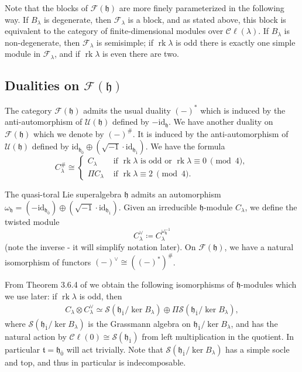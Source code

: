 \documentclass[12pt, a4paper, reqno]{amsart}
\def\FF{\mathcal{F}}
\def\SS{\mathcal{S}}
\def\CC{\mathcal{C}}
\def\h{\mathfrak{h}}
\def\ol{\overline}
\def\rk{\operatorname{rk}}
\theoremstyle{definition}
\theoremstyle{definition}
\theoremstyle{definition}
\numberwithin{theorem}{section}
\numberwithin{lemma}{section}
\numberwithin{remark}{section}
\numberwithin{definition}{section}
\numberwithin{corollary}{section}
\numberwithin{proposition}{section}
\numberwithin{example}{section}
\begin{document}
	Note that the blocks of \(\mathcal{F}(\mathfrak{h})\) are more finely parameterized in the following way. If \(B_\lambda\) is degenerate, then $\FF_{\lambda}$ is a block, and as stated above, this block is equivalent to the category of finite-dimensional modules over \(\CC\ell(\lambda)\). If \(B_{\lambda}\) is non-degenerate, then $\FF_{\lambda}$ is semisimple; if \(\rk \lambda\) is odd there is exactly one simple module in $\FF_{\lambda}$, and if \(\rk \lambda\) is even there are two. 
	
	\subsection{Dualities on $\FF(\h)$}\label{section_dualities}
	The category \(\mathcal{F}(\mathfrak{h})\) admits the usual duality \((-)^*\) which is induced by the anti-automorphism of \(\mathcal{U}(\mathfrak{h})\) defined by \(-\mathrm{id}_{\mathfrak{h}}\). We have another duality on \(\mathcal{F}(\mathfrak{h})\) which we denote by \((-)^\#\). It is induced by the anti-automorphism of \(\mathcal{U}(\mathfrak{h})\) defined by \(\mathrm{id}_{\mathfrak{h}_{\ol{0}}}\oplus(\sqrt{-1}\cdot\mathrm{id}_{\mathfrak{h}_{\ol{1}}})\). We have the formula
	\[
	C_{\lambda}^\#\cong \begin{cases}
		C_{\lambda} & \text{ if }\rk\lambda \text{ is odd or }\rk\lambda\equiv0\ \pmod4,\\
		\Pi C_{\lambda} & \text{ if }\rk\lambda\equiv 2\ \pmod4.
	\end{cases}
	\] 
	
	The quasi-toral Lie superalgebra \(\mathfrak{h}\) admits an automorphism \(\omega_{\mathfrak{h}} = (-\mathrm{id}_{\mathfrak{h}_{\ol{0}}})\oplus(\sqrt{-1}\cdot\mathrm{id}_{\mathfrak{h}_{\ol{1}}})\). Given an irreducible \(\mathfrak{h}\)-module \(C_{\lambda}\), we define the twisted module 
	\[
	C_{\lambda}^{\vee} \coloneq C_{\lambda}^{\omega_{\mathfrak{h}}^{-1}}
	\]
	(note the inverse - it will simplify notation later).  On $\FF(\h)$, we have a natural isomorphism of functors \((-)^\vee \cong ((-)^*)^\#\).
	
	From Theorem 3.6.4 of \cite{GSS} we obtain the following isomorphisms of $\h$-modules which we use later: if \(\rk\lambda \) is odd, then 
	\begin{align}\label{equation-2Z+1}
		C_{\lambda}\otimes C_{\lambda}^\vee \simeq \mathcal{S}(\mathfrak{h}_{\ol{1}}/\ker B_{\lambda})\oplus \Pi \mathcal{S}(\mathfrak{h}_{\ol{1}}/\ker B_{\lambda}),
	\end{align}
	where $\SS(\mathfrak{h}_{\ol{1}}/\ker B_{\lambda})$ is the Grassmann algebra on $\mathfrak{h}_{\ol{1}}/\ker B_{\lambda}$, and has the natural action by $\CC\ell(0)\cong\SS(\h_{\ol{1}})$ from left multiplication in the quotient.  In particular $\mathfrak{t}=\h_{\ol{0}}$ will act trivially.  Note that $\SS(\mathfrak{h}_{\ol{1}}/\ker B_{\lambda})$ has a simple socle and top, and thus in particular is indecomposable.
	
\end{document}
